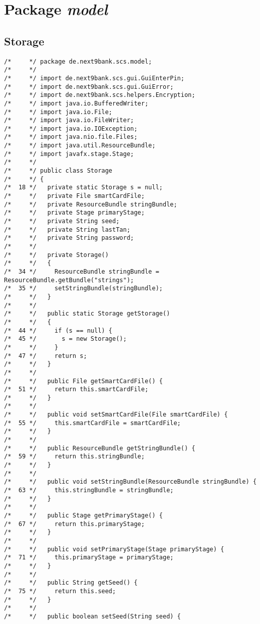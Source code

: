 \section{Package \textit{model}}

\subsection{Storage}

\begin{lstlisting}
/*     */ package de.next9bank.scs.model;
/*     */ 
/*     */ import de.next9bank.scs.gui.GuiEnterPin;
/*     */ import de.next9bank.scs.gui.GuiError;
/*     */ import de.next9bank.scs.helpers.Encryption;
/*     */ import java.io.BufferedWriter;
/*     */ import java.io.File;
/*     */ import java.io.FileWriter;
/*     */ import java.io.IOException;
/*     */ import java.nio.file.Files;
/*     */ import java.util.ResourceBundle;
/*     */ import javafx.stage.Stage;
/*     */ 
/*     */ public class Storage
/*     */ {
/*  18 */   private static Storage s = null;
/*     */   private File smartCardFile;
/*     */   private ResourceBundle stringBundle;
/*     */   private Stage primaryStage;
/*     */   private String seed;
/*     */   private String lastTan;
/*     */   private String password;
/*     */ 
/*     */   private Storage()
/*     */   {
/*  34 */     ResourceBundle stringBundle = ResourceBundle.getBundle("strings");
/*  35 */     setStringBundle(stringBundle);
/*     */   }
/*     */ 
/*     */   public static Storage getStorage()
/*     */   {
/*  44 */     if (s == null) {
/*  45 */       s = new Storage();
/*     */     }
/*  47 */     return s;
/*     */   }
/*     */ 
/*     */   public File getSmartCardFile() {
/*  51 */     return this.smartCardFile;
/*     */   }
/*     */ 
/*     */   public void setSmartCardFile(File smartCardFile) {
/*  55 */     this.smartCardFile = smartCardFile;
/*     */   }
/*     */ 
/*     */   public ResourceBundle getStringBundle() {
/*  59 */     return this.stringBundle;
/*     */   }
/*     */ 
/*     */   public void setStringBundle(ResourceBundle stringBundle) {
/*  63 */     this.stringBundle = stringBundle;
/*     */   }
/*     */ 
/*     */   public Stage getPrimaryStage() {
/*  67 */     return this.primaryStage;
/*     */   }
/*     */ 
/*     */   public void setPrimaryStage(Stage primaryStage) {
/*  71 */     this.primaryStage = primaryStage;
/*     */   }
/*     */ 
/*     */   public String getSeed() {
/*  75 */     return this.seed;
/*     */   }
/*     */ 
/*     */   public boolean setSeed(String seed) {

\end{lstlisting}
